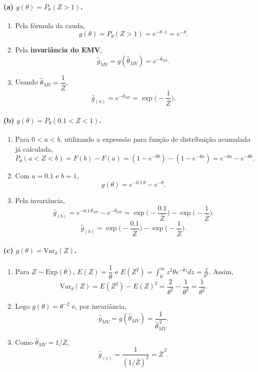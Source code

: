 \paragraph{(a) \(g(\theta)=P_\theta(Z>1)\).}

\begin{enumerate}
  \item Pela fórmula da cauda,
  \[
  g(\theta)=P_\theta(Z>1)=e^{-\theta\cdot 1}=e^{-\theta}.
  \]
  \item Pela \textbf{invariância do EMV},
  \[
  \widehat g_{MV}=g(\widehat\theta_{MV})=e^{-\widehat\theta_{MV}}.
  \]
  \item Usando \(\widehat\theta_{MV}=\dfrac{1}{\overline Z}\),
  \[
  \boxed{\;\widehat g_{(a)}=e^{-\widehat\theta_{MV}}
        =\exp\!\Big(-\frac{1}{\overline Z}\Big).\;}
  \]
\end{enumerate}

\bigskip
\paragraph{(b) \(g(\theta)=P_\theta(0.1<Z<1)\).}

\begin{enumerate}
  \item Para \(0<a<b\), utilizando a expressão para função de distribuição acumulada já calculada,
  \[
  P_\theta(a<Z<b)=F(b)-F(a)=(1-e^{-\theta b})-(1-e^{-\theta a})
                 =e^{-\theta a}-e^{-\theta b}.
  \]
  \item Com \(a=0.1\) e \(b=1\),
  \[
  g(\theta)=e^{-0.1\,\theta}-e^{-\theta}.
  \]
  \item Pela invariância,
  \[
  \;\widehat g_{(b)}=e^{-0.1\,\widehat\theta_{MV}}-e^{-\widehat\theta_{MV}}
        =\exp\!\Big(-\frac{0.1}{\overline Z}\Big)-\exp\!\Big(-\frac{1}{\overline Z}\Big).\;
  \]
  \[
  \boxed{\;\widehat g_{(b)}=
        \exp\!\Big(-\frac{0.1}{\overline Z}\Big)-\exp\!\Big(-\frac{1}{\overline Z}\Big).\;}
  \]
\end{enumerate}

\bigskip
\paragraph{(c) \(g(\theta)=\mathrm{Var}_\theta(Z)\).}

\begin{enumerate}
  \item Para \(Z\sim\mathrm{Exp}(\theta)\), \(E(Z)=\dfrac{1}{\theta}\) e
        \(E(Z^2)=\displaystyle\int_0^\infty z^2\theta e^{-\theta z}dz
                 =\frac{2}{\theta^2}\).
        Assim,
        \[
        \mathrm{Var}_\theta(Z)=E(Z^2)-E(Z)^2=\frac{2}{\theta^2}-\frac{1}{\theta^2}
        =\frac{1}{\theta^2}.
        \]
  \item Logo \(g(\theta)=\theta^{-2}\) e, por invariância,
        \[
        \widehat g_{MV}=g(\widehat\theta_{MV})=\frac{1}{\widehat\theta_{MV}^{\,2}}.
        \]
  \item Como \(\widehat\theta_{MV}=1/\overline Z\),
        \[
        \boxed{\;\widehat g_{(c)}=\frac{1}{(1/\overline Z)^2}=\overline Z^{\,2}. \;}
        \]
\end{enumerate}


